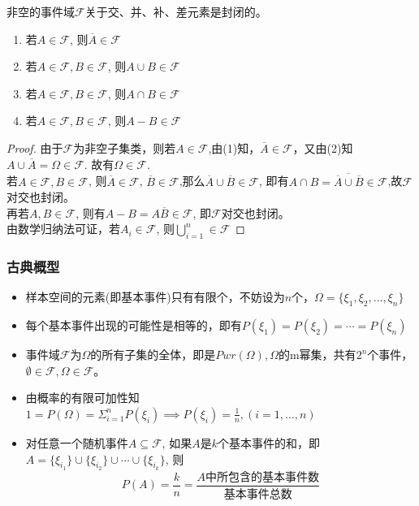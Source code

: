 \begin{frame}
	非空的事件域$\mathcal{F}$关于交、并、补、差元素是封闭的。
	\begin{enumerate}
		\item 若$A\in\mathcal{F}$, 则$\overline{A}\in\mathcal{F}$
		\item 若$A\in\mathcal{F},B\in\mathcal{F}$, 则$A\cup B\in \mathcal{F}$
		\item 若$A\in\mathcal{F},B\in\mathcal{F}$, 则$A\cap B\in \mathcal{F}$
		\item 若$A\in\mathcal{F},B\in\mathcal{F}$, 则$A- B\in \mathcal{F}$
	\end{enumerate}
	\begin{proof}
		由于$\mathcal{F}$为非空子集类，则若$A\in\mathcal{F}$,由(1)知，$\overline{A}\in\mathcal{F}$，又由(2)知$A\cup\overline{A}=\Omega\in\mathcal{F}$. 故有$\Omega\in\mathcal{F}$. \\
		若$A\in\mathcal{F},B\in\mathcal{F}$, 则$\overline{A}\in\mathcal{F}$, $\overline{B}\in\mathcal{F}$,那么$\overline{A}\cup\overline{B}\in\mathcal{F}$, 即有$A\cap B=\overline{\overline{A}\cup\overline{B}}\in\mathcal{F}$,故$\mathcal{F}$对交也封闭。\\
		再若$A,B\in\mathcal{F}$, 则有$A-B=A\overline{B}\in\mathcal{F}$, 即$\mathcal{F}$对交也封闭。\\
		由数学归纳法可证，若$A_i\in\mathcal{F}$, 则$\bigcup_{i=1}^{n}\in\mathcal{F}$
	\end{proof}
\end{frame}

\begin{frame}
\frametitle{古典概型}
\begin{itemize}
	\item 样本空间的元素(即基本事件)只有有限个，不妨设为$n$个，$\Omega=\{\xi_1,\xi_2,\dots,\xi_n\}$
	\item 每个基本事件出现的可能性是相等的，即有$P(\xi_1)=P(\xi_2)=\cdots=P(\xi_n)$
	\item 事件域$\mathcal{F}$为$\Omega$的所有子集的全体，即是$Pwr(\Omega),\Omega$的m幂集，共有$2^n$个事件，$\emptyset\in\mathcal{F},\Omega\in\mathcal{F}$。
	\item 由概率的有限可加性知\\
	$1=P(\Omega)=\Sigma_{i=1}^{n}P(\xi_i)\implies P(\xi_i)=\frac{1}{n},(i=1,\dots,n)$
	\item 对任意一个随机事件$A\subseteq\mathcal{F}$, 如果$A$是$k$个基本事件的和，即$A=\{\xi_{i_1}\}\cup \{\xi_{i_2}\}\cup\cdots\cup\{\xi_{i_k}\}$, 则
	$$P(A)=\frac{k}{n}=\frac{\text{$A$中所包含的基本事件数}}{\text{基本事件总数}}$$
\end{itemize}
\end{frame}

